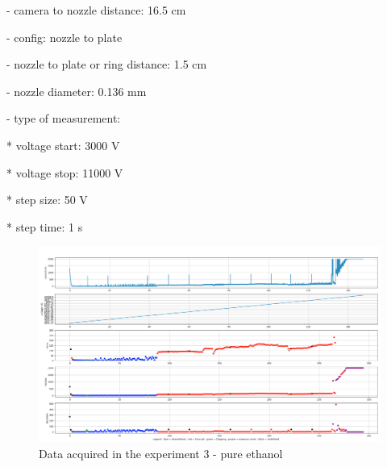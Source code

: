     - camera to nozzle distance: 16.5 cm

    - config: nozzle to plate

    - nozzle to plate or ring distance: 1.5 cm

    - nozzle diameter: 0.136 mm

    - type of measurement: 

        * voltage start: 3000 V

        * voltage stop: 11000 V

        * step size: 50 V 

        * step time: 1 s

    \begin{figure}[H]
        \center
        \includegraphics[width=17cm]{images/images_folder_3/data4.png}
        \caption{Data acquired in the experiment 3 - pure ethanol}
    \end{figure}

